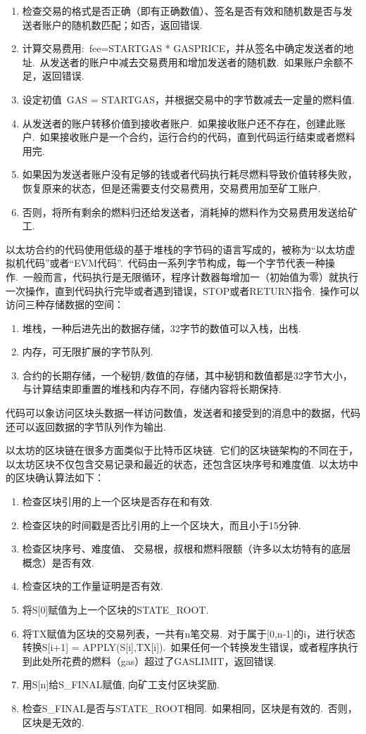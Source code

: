 \documentclass[a4paper,12pt,titlepage]{ctexart}
\begin{document}
\begin{enumerate}
\item 检查交易的格式是否正确（即有正确数值）、签名是否有效和随机数是否与发送者账户的随机数匹配；如否，返回错误.~
\item 计算交易费用:~fee=STARTGAS * GASPRICE，并从签名中确定发送者的地址.~从发送者的账户中减去交易费用和增加发送者的随机数.~如果账户余额不足，返回错误.~
\item 设定初值~GAS = STARTGAS，并根据交易中的字节数减去一定量的燃料值.~
\item 从发送者的账户转移价值到接收者账户.~如果接收账户还不存在，创建此账户.~如果接收账户是一个合约，运行合约的代码，直到代码运行结束或者燃料用完.~
\item 如果因为发送者账户没有足够的钱或者代码执行耗尽燃料导致价值转移失败，恢复原来的状态，但是还需要支付交易费用，交易费用加至矿工账户.~
\item 否则，将所有剩余的燃料归还给发送者，消耗掉的燃料作为交易费用发送给矿工.~
\end{enumerate}\par
以太坊合约的代码使用低级的基于堆栈的字节码的语言写成的，被称为“以太坊虚拟机代码”或者“EVM代码”.~代码由一系列字节构成，每一个字节代表一种操作.~一般而言，代码执行是无限循环，程序计数器每增加一（初始值为零）就执行一次操作，直到代码执行完毕或者遇到错误，STOP或者RETURN指令.~操作可以访问三种存储数据的空间：
\begin{enumerate}
\item 堆栈，一种后进先出的数据存储，32字节的数值可以入栈，出栈.~
\item 内存，可无限扩展的字节队列.~
\item 合约的长期存储，一个秘钥/数值的存储，其中秘钥和数值都是32字节大小，与计算结束即重置的堆栈和内存不同，存储内容将长期保持.~
\end{enumerate}\par
代码可以象访问区块头数据一样访问数值，发送者和接受到的消息中的数据，代码还可以返回数据的字节队列作为输出.~\par
以太坊的区块链在很多方面类似于比特币区块链.~它们的区块链架构的不同在于，以太坊区块不仅包含交易记录和最近的状态，还包含区块序号和难度值.~以太坊中的区块确认算法如下：
\begin{enumerate}
\item 检查区块引用的上一个区块是否存在和有效.~
\item 检查区块的时间戳是否比引用的上一个区块大，而且小于15分钟.~
\item 检查区块序号、难度值、 交易根，叔根和燃料限额（许多以太坊特有的底层概念）是否有效.~
\item 检查区块的工作量证明是否有效.~
\item 将S[0]赋值为上一个区块的STATE\_ROOT.~
\item 将TX赋值为区块的交易列表，一共有n笔交易.~对于属于[0,n-1]的i，进行状态转换S[i+1] = APPLY(S[i],TX[i]).~如果任何一个转换发生错误，或者程序执行到此处所花费的燃料（gas）超过了GASLIMIT，返回错误.~
\item 用S[n]给S\_FINAL赋值, 向矿工支付区块奖励.~
\item 检查S\_FINAL是否与STATE\_ROOT相同.~如果相同，区块是有效的.~否则，区块是无效的.~
\end{enumerate}\par
\end{document}
